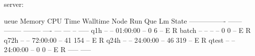 \begin{prompt}
server: %

ueue            Memory CPU Time Walltime Node  Run Que Lm  State
---------------- ------ -------- -------- ----  --- --- --  -----
q1h                --      --    01:00:00   --    0   6 --   E R
batch              --      --       --      --    0   0 --   E R
q72h               --      --    72:00:00   --   41 154 --   E R
q24h               --      --    24:00:00   --   46 319 --   E R
qtest              --      --    24:00:00   --    0   0 --   E R
                                               ----- -----
\end{prompt}
